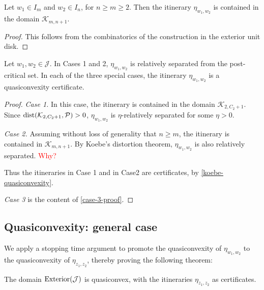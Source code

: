 \begin{lemma}
Let $w_1 \in I_m$ and $w_2 \in I_n$, for $n \geq m \geq 2$. Then the itinerary $\eta_{w_1,w_2}$ is contained in the domain $\mathcal K_{m,n+1}$.
\end{lemma}

\begin{proof}
    This follows from the combinatorics of the construction in the exterior unit disk. 
\end{proof}

\begin{lemma}
\label{case 1 rel. sep}
Let $w_1,w_2 \in \mathcal J$. In Cases 1 and 2, $\eta_{w_1,w_2}$ is relatively separated from the post-critical set. In each of the three special cases, the itinerary $\eta_{w_1,w_2}$ is a quasiconvexity certificate. 
\end{lemma}

\begin{proof}
\emph{Case 1.} In this case, the itinerary is contained in the domain $\mathcal K_{2, C_2+1}$.
Since $\operatorname{dist}(\mathcal K_{2, C_2+1}, \mathcal P)>0$, $\eta_{w_1,w_2}$ is $\eta$-relatively separated for some $\eta>0$. 

\emph{Case 2.}
Assuming without loss of generality that $n \geq m$, the itinerary is contained in $\mathcal K_{m,n+1}$. By Koebe's distortion theorem, $\eta_{w_1,w_2}$ is also relatively separated.
{\large \textcolor{red}{Why?}}

Thus the itineraries in Case 1 and in Case2 are certificates, by \cref{koebe-quasiconvexity}.

\emph{Case 3} is the content of \cref{case-3-proof}.
\end{proof}

\subsection{Quasiconvexity: general case}
We apply a stopping time argument to promote the quasiconvexity of $\eta_{w_1,w_2}$ to the quasiconvexity of $\eta_{z_1,z_2}$, thereby proving the following theorem:

\begin{theorem} \label{quasiconvex-Cauliflower}
	The domain $\operatorname{Exterior}(\mathcal{J})$ is quasiconvex, with the itineraries $\eta_{z_1,z_2}$ as certificates.
\end{theorem}

